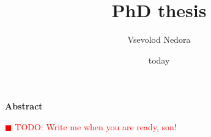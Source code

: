 \documentclass[11pt,a4paper,headinclude=true,DIV=14,BCOR=8mm,chapterprefix,listof=totoc,twoside,openright,abstracton]{scrbook}
\title{PhD thesis}
\author{Vsevolod Nedora}
\date{today}
\newcommand{\todo}[1]{\textcolor{red}{$\blacksquare$ TODO: #1}}
\begin{document}
\maketitle


\mainmatter

\begin{center}
    \textbf{Abstract} \\[1cm]
\end{center}
\todo{Write me when you are ready, son!}









\appendix


\backmatter


\end{document}
